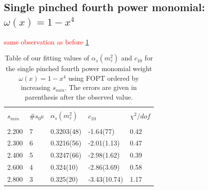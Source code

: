 \documentclass[../../index.tex]{subfiles}
\begin{document}
\subsection{Single pinched fourth power monomial: $\omega(x) = 1-x^4$}
\textcolor{red}{same observation as before} \cref{table:fitM4AlD10}
\begin{table}
  \centering
  \begin{tabular}{lllll}
    \toprule \\
    $s_{min}$ & \#$s_0$s & $\alpha_s(m_\tau^2)$ & $c_{10}$ & $\chi^2/dof$  \\
    \hline \\
    2.200 & 7  & 0.3203(48) & -1.64(77) & 0.42 \\
    2.300 & 6  & 0.3216(56) & -2.01(1.13) & 0.47 \\
    2.400 & 5  & 0.3247(66) & -2.98(1.62) & 0.39 \\
    2.600 & 4  & 0.324(10) & -2.86(3.69) & 0.58 \\
    2.800 & 3  & 0.325(20) & -3.43(10.74) & 1.17 \\
    \bottomrule
  \end{tabular}
  \caption{Table of our fitting values of $\alpha_s(m_\tau^2)$ and $c_{10}$
    for the single pinched fourth power monomial weight $\omega(x)=1-x^4$ using FOPT ordered
    by increasing $s_{min}$. The errors are given in parenthesis after the observed value.}
  \label{table:fitM4AlD10}
\end{table}
\end{document}
